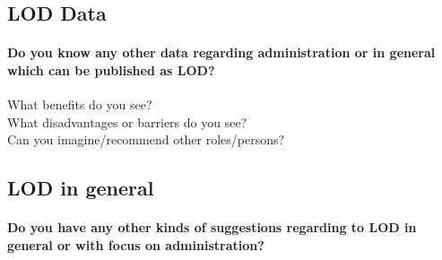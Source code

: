 \subsection*{LOD Data}
\paragraph{Do you know any other data regarding administration or in general which can be published as LOD?}
\openfour
What benefits do you see?\\
\opentwo
What disadvantages or barriers do you see?\\
\opentwo
Can you imagine/recommend other roles/persons?\\
\opentwo
\newpage

\subsection*{LOD in general}
\paragraph{Do you have any other kinds of suggestions regarding to LOD in general or with focus on administration?}
\openfour
